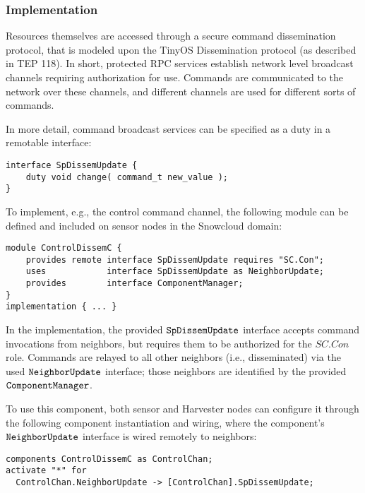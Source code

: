 \subsubsection{Implementation}

Resources themselves are accessed through a secure command dissemination protocol, that is
modeled upon the TinyOS Dissemination protocol (as described in TEP 118). In short, protected
RPC services establish network level broadcast channels requiring authorization for use.
Commands are communicated to the network over these channels, and different channels are used
for different sorts of commands.

In more detail, command broadcast services can be specified as a duty in a remotable interface:

\singlespace
\vspace{1.0ex}
\begin{lstlisting}[language=nesC]
interface SpDissemUpdate {
    duty void change( command_t new_value );
}
\end{lstlisting}
\vspace{1.0ex}
\primaryspacing

To implement, e.g., the control command channel, the following module can be defined and
included on sensor nodes in the Snowcloud domain:

\singlespace
\vspace{1.0ex}
\begin{lstlisting}[language=nesC]
module ControlDissemC {
    provides remote interface SpDissemUpdate requires "SC.Con";
    uses            interface SpDissemUpdate as NeighborUpdate;
    provides        interface ComponentManager;
}
implementation { ... }
\end{lstlisting}
\vspace{1.0ex}
\primaryspacing

In the implementation, the provided $\verb+SpDissemUpdate+$ interface accepts command
invocations from neighbors, but requires them to be authorized for the $\mathit{SC.Con}$ role.
Commands are relayed to all other neighbors (i.e., disseminated) via the used
$\verb+NeighborUpdate+$ interface; those neighbors are identified by the provided
$\verb+ComponentManager+$.

To use this component, both sensor and Harvester nodes can configure it through the following
component instantiation and wiring, where the component's $\verb+NeighborUpdate+$ interface is
wired remotely to neighbors:

\singlespace
\vspace{1.0ex}
\begin{lstlisting}[language=nesC]
components ControlDissemC as ControlChan;
activate "*" for 
  ControlChan.NeighborUpdate -> [ControlChan].SpDissemUpdate;
\end{lstlisting}
\vspace{1.0ex}
\primaryspacing

